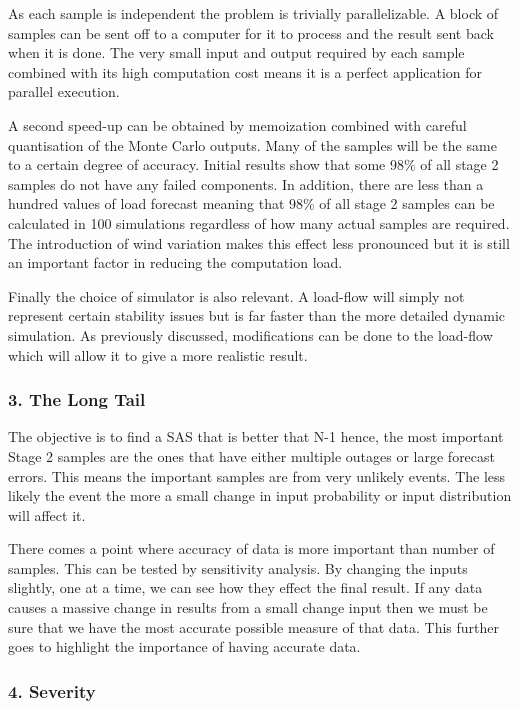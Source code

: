 \documentclass[a4paper,oneside,12pt]{report}
\begin{document}
As each sample is independent the problem is trivially parallelizable. A block of samples can be sent off to a computer for it to process and the result sent back when it is done. The very small input and output required by each sample combined with its high computation cost means it is a perfect application for parallel execution.

A second speed-up can be obtained by memoization combined with careful quantisation of the Monte Carlo outputs. Many of the samples will be the same to a certain degree of accuracy. Initial results show that some 98\% of all stage 2 samples do not have any failed components. In addition, there are less than a hundred values of load forecast meaning that 98\% of all stage 2 samples can be calculated in 100 simulations regardless of how many actual samples are required. The introduction of wind variation makes this effect less pronounced but it is still an important factor in reducing the computation load.

Finally the choice of simulator is also relevant. A load-flow will simply not represent certain stability issues but is far faster than the more detailed dynamic simulation. As previously discussed, modifications can be done to the load-flow which will allow it to give a more realistic result.

\subsubsection{3. The Long Tail}

The objective is to find a SAS that is better that N-1 hence, the most important Stage 2 samples are the ones that have either multiple outages or large forecast errors. This means the important samples are from very unlikely events. The less likely the event the more a small change in input probability or input distribution will affect it.

There comes a point where accuracy of data is more important than number of samples. This can be tested by sensitivity analysis. By changing the inputs slightly, one at a time, we can see how they effect the final result. If any data causes a massive change in results from a small change input then we must be sure that we have the most accurate possible measure of that data. This further goes to highlight the importance of having accurate data.

\subsubsection{4. Severity}\label{sec_limit_severity}
\end{document}
